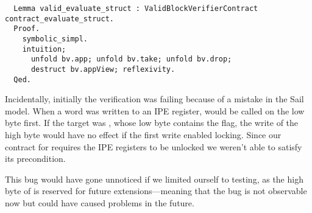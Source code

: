 \begin{verbatim}
  Lemma valid_evaluate_struct : ValidBlockVerifierContract contract_evaluate_struct.
  Proof.
    symbolic_simpl.
    intuition;
      unfold bv.app; unfold bv.take; unfold bv.drop;
      destruct bv.appView; reflexivity.
  Qed.
\end{verbatim}

Incidentally, initially the verification was failing because of a mistake in the Sail model. When a word was written to an IPE register,  would be called on the low byte first. If the target was , whose low byte contains the  flag, the write of the high byte would have no effect if the first write enabled locking. Since our contract for  requires the IPE registers to be unlocked we weren't able to satisfy its precondition.

This bug would have gone unnoticed if we limited ourself to testing, as the high byte of  is reserved for future extensions---meaning that the bug is not observable now but could have caused problems in the future.



